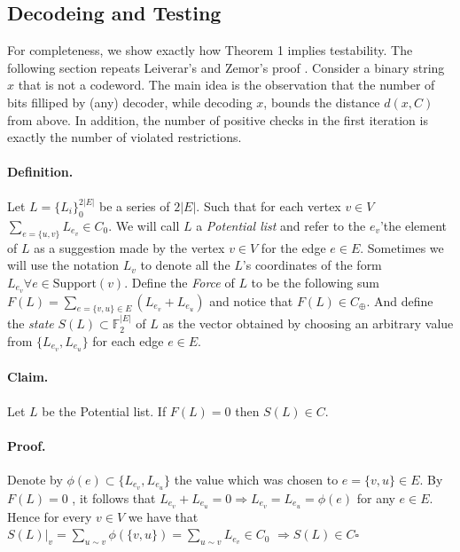 \documentclass[sigplan,screen]{acmart}
\begin{document}
\begin{multicols*}{2}
  \section{Decodeing and Testing}
  For completeness, we show exactly how Theorem 1 implies testability. The following section repeats Leiverar's and Zemor's proof \cite{leverrier2022quantum}. Consider a binary string $x$ that is not a codeword. The main idea is the observation that the number of bits filliped by (any) decoder, while decoding $x$, bounds the distance $d\left( x, C \right)$ from above. In addition, the number of positive checks in the first iteration is exactly the number of violated restrictions.
  \paragraph{Definition.}Let $L = \{L_{i}\}^{2|E|}_{0}$  be a series of $2|E|$. Such that for each vertex $ v \in V$ $\sum_{ e = \{u,v\} }{ L_{e_v} } \in C_{0}$. We will call $L$ a \textit{Potential list} and refer to the $e_{v}$'the element of $L$ as a suggestion made by the vertex $v \in V$ for the edge $e \in E$. Sometimes we will use the notation $L_{v}$ to denote all the $L$'s coordinates of the form $ L_{e_{v}} \forall e \in \text{Support} \left( v \right) $. Define the \textit{Force} of $L$ to be the following sum $  F\left( L \right) = \sum_{e = \{v,u\} \in E }{ \left(L_{e_v} + L_{e_u}\right) }$ and notice that $ F\left( L \right) \in C_{\oplus}$. And define the \textit{state} $S(L) \subset \mathbb{F}^{|E|}_{2}$ of $L$ as the vector obtained by choosing an arbitrary value from $ \{ L_{e_v}, L_{e_u} \}$ for each edge $e \in E$.  
  \paragraph{Claim.} Let $L$ be the Potential list. If $F(L)=0$ then $S(L)\in C$.
  \paragraph{Proof.} Denote by $\phi\left( e \right) \subset \{ L_{e_v}, L_{e_u} \}$ the value which was chosen to $e = \{v,u\} \in E$. By $F\left(L\right) = 0$ , it follows that $ L_{e_v} + L_{e_u} = 0 \Rightarrow L_{e_v} = L_{e_u} = \phi\left( e \right) $ for any $e \in E$. Hence for every $v\in V$ we have that $ S\left( L \right)|_{v} = \sum_{u \sim v}{ \phi\left( \{v,u\} \right) } =  \sum_{u \sim v}{ L_{e_v }} \in C_{0}$ $ \Rightarrow S\left( L \right) \in C \square$   


\end{multicols*}
\end{document}
